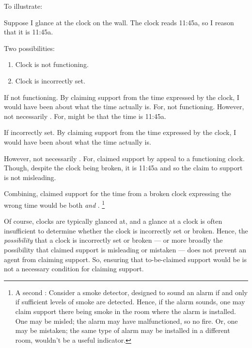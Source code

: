 \begin{note}[M\&M \illu{2}]
  To illustrate:

  \begin{illustration}[Clock]
    \label{illu:mom:clock}
    Suppose I glance at the clock on the wall.
    The clock reads 11:45a, so I reason that it is 11:45a.
  \end{illustration}

  Two possibilities:
  \begin{enumerate}
  \item Clock is not functioning.
  \item Clock is incorrectly set.
  \end{enumerate}

  If not functioning.
  By claiming support from the time expressed by the clock, I would have been \emph{\misled{}} about what the time actually is.
  For, not functioning.
  However, not necessarily \mistaken{}.
  For, might be that the time is 11:45a.

  If incorrectly set.
  By claiming support from the time expressed by the clock, I would have been \emph{\mistaken{}} about what the time actually is.

  However, not necessarily \misled{}.
  For, claimed support by appeal to a functioning clock.
  Though, despite the clock being broken, it is 11:45a and so the claim to support is not misleading.

  Combining, claimed support for the time from a broken clock expressing the wrong time would be both \misled{} \emph{and} \mistaken{}.\nolinebreak
  \footnote{
    A second :
    Consider a smoke detector, designed to sound an alarm if and only if sufficient levels of smoke are detected.
    Hence, if the alarm sounds, one may claim support there being smoke in the room where the alarm is installed.
    One may be misled; the alarm may have malfunctioned, so no fire.
    Or, one may be mistaken; the same type of alarm may be installed in a different room, wouldn't be a useful indicator.
  }

  {
    \color{red}
    Of course, clocks are typically glanced at, and a glance at a clock is often insufficient to determine whether the clock is incorrectly set or broken.
    Hence, the \emph{possibility} that a clock is incorrectly set or broken --- or more broadly the possibility that claimed support is misleading or mistaken --- does not prevent an agent from claiming support.
    So, ensuring that to-be-claimed support would be \mom{} is not a necessary condition for claiming support.
  }
\end{note}

